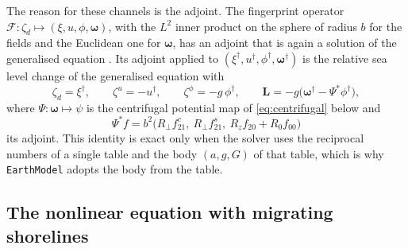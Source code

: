 \documentclass[11pt,a4paper]{article}
\newcommand{\code}[1]{\texttt{#1}}
\numberwithin{equation}{section}
\begin{document}
The reason for these channels is the adjoint. The fingerprint operator
$\mathcal{F}:\zeta_{d}\mapsto(\xi,u,\phi,\bm{\omega})$, with the $L^{2}$ inner
product on the sphere of radius $b$ for the fields and the Euclidean one for
$\bm{\omega}$, has an adjoint that is again a solution of the generalised equation
\citep{AlAttarEtAl2024}. Its adjoint applied to
$(\xi^{\dagger},u^{\dagger},\phi^{\dagger},\bm{\omega}^{\dagger})$ is the
relative sea level change of the generalised equation with
\begin{equation}
\zeta_{d} = \xi^{\dagger},\qquad
\zeta^{u} = -u^{\dagger},\qquad
\zeta^{\phi} = -g\,\phi^{\dagger},\qquad
\mathbf{L} = -g\big(\bm{\omega}^{\dagger}-\Psi^{*}\phi^{\dagger}\big),
\label{eq:adjoint}
\end{equation}
where $\Psi:\bm{\omega}\mapsto\psi$ is the centrifugal potential map of
\eqref{eq:centrifugal} below and
\begin{equation}
\Psi^{*}f = b^{2}\big(R_{\perp}f^{c}_{21},\ R_{\perp}f^{s}_{21},\ R_{z}f_{20}+R_{0}f_{00}\big)
\end{equation}
its adjoint. This identity is exact only when the solver uses the reciprocal
numbers of a single table and the body $(a,g,G)$ of that table, which is why
\code{EarthModel} adopts the body from the table.

\subsection{The nonlinear equation with migrating shorelines}
\end{document}
